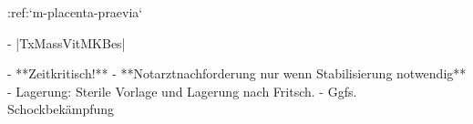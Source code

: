 :ref:`m-placenta-praevia`
\begin{itemize}
    -   |TxMassVitMKBes|
    \begin{itemize}
      -   **Zeitkritisch!**
      -   **Notarztnachforderung nur wenn Stabilisierung
      notwendig**
        -   Lagerung: Sterile Vorlage und Lagerung nach
        Fritsch.
        -   Ggfs. Schockbekämpfung
    \end{itemize}
\end{itemize} \autocite{MA70-Protokoll-2012-10-11}